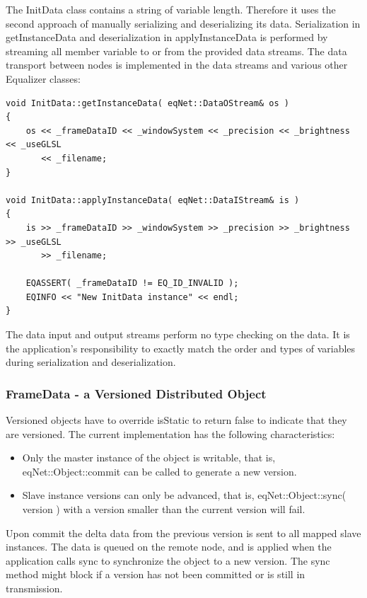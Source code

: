\documentclass[10pt,a4]{scrartcl}
\begin{document}
The \textsf{InitData} class contains a string of variable
length. Therefore it uses the second approach of manually serializing
and deserializing its data. Serialization in
\textsf{getInstanceData} and deserialization in
\textsf{applyInstanceData} is performed by streaming all member variable to or from
the provided data streams. The data transport between nodes is
implemented in the data streams and various other Equalizer classes:

{\footnotesize\begin{lstlisting}
void InitData::getInstanceData( eqNet::DataOStream& os )
{
    os << _frameDataID << _windowSystem << _precision << _brightness << _useGLSL
       << _filename;
}

void InitData::applyInstanceData( eqNet::DataIStream& is )
{
    is >> _frameDataID >> _windowSystem >> _precision >> _brightness >> _useGLSL
       >> _filename;

    EQASSERT( _frameDataID != EQ_ID_INVALID );
    EQINFO << "New InitData instance" << endl;
}
\end{lstlisting}}%

The data input and output streams perform no type checking on the data.
It is the application's responsibility to exactly match the order and
types of variables during serialization and deserialization.

\subsubsection{FrameData - a Versioned Distributed Object}

Versioned objects have to override \textsf{isStatic} to return false to
indicate that they are versioned. The current implementation has the
following characteristics:
\begin{itemize}
\item Only the master instance of the object is writable, that is,
  \textsf{eqNet::Object::com\-mit} can be called to generate a new
  version.
\item Slave instance versions can only be advanced, that is,
  \textsf{eqNet::Object::sync( version )} with a version smaller than
  the current version will fail.
\end{itemize}

Upon \textsf{commit} the delta data from the previous version is sent to
all mapped slave instances. The data is queued on the remote node, and
is applied when the application calls \textsf{sync} to synchronize the
object to a new version. The \textsf{sync} method might block if a
version has not been committed or is still in transmission.
\end{document}
